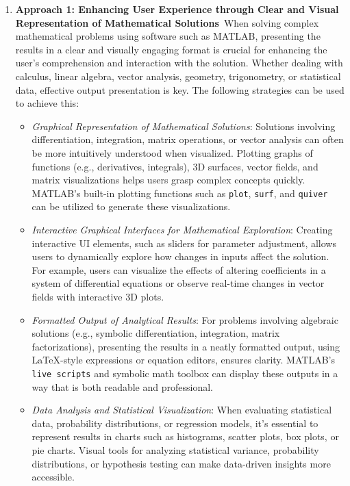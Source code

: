 \documentclass[a4paper, 12pt]{report}
\begin{document}
\begin{itemize}
        \begin{enumerate}[itemsep=-0.1cm] 
            \item \textbf{Approach 1: Enhancing User Experience through Clear and Visual Representation of Mathematical Solutions}\ When solving complex mathematical problems using software such as MATLAB, presenting the results in a clear and visually engaging format is crucial for enhancing the user’s comprehension and interaction with the solution. Whether dealing with calculus, linear algebra, vector analysis, geometry, trigonometry, or statistical data, effective output presentation is key. The following strategies can be used to achieve this: \begin{itemize}[itemsep=-0.1cm] \item \textit{Graphical Representation of Mathematical Solutions}: Solutions involving differentiation, integration, matrix operations, or vector analysis can often be more intuitively understood when visualized. Plotting graphs of functions (e.g., derivatives, integrals), 3D surfaces, vector fields, and matrix visualizations helps users grasp complex concepts quickly. MATLAB's built-in plotting functions such as \texttt{plot}, \texttt{surf}, and \texttt{quiver} can be utilized to generate these visualizations. \item \textit{Interactive Graphical Interfaces for Mathematical Exploration}: Creating interactive UI elements, such as sliders for parameter adjustment, allows users to dynamically explore how changes in inputs affect the solution. For example, users can visualize the effects of altering coefficients in a system of differential equations or observe real-time changes in vector fields with interactive 3D plots. \item \textit{Formatted Output of Analytical Results}: For problems involving algebraic solutions (e.g., symbolic differentiation, integration, matrix factorizations), presenting the results in a neatly formatted output, using LaTeX-style expressions or equation editors, ensures clarity. MATLAB's \texttt{live scripts} and symbolic math toolbox can display these outputs in a way that is both readable and professional. \item \textit{Data Analysis and Statistical Visualization}: When evaluating statistical data, probability distributions, or regression models, it's essential to represent results in charts such as histograms, scatter plots, box plots, or pie charts. Visual tools for analyzing statistical variance, probability distributions, or hypothesis testing can make data-driven insights more accessible. 

\end{itemize}
\end{enumerate}
\end{itemize}
\end{document}
